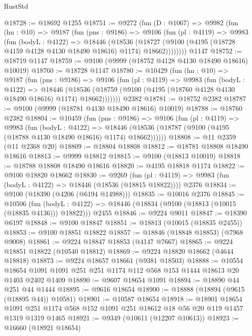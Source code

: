 \begin{lexlean}{RustStd}
\begin{coremodule}
@18728 := @18692 @1255
@18751 := @9272
    (fun (D : @1067) =>
    @9982
      (fun (hn : @10) =>
      @9187
        (fun (pns : @9186) =>
        @9106
          (fun (pl : @4119) =>
          @9983
            (fun (bodyL : @4122) =>
            @18446
              (@18536
                (@18727 (@9100 (@4195 (@18728 @4159 @4128 @4130 @18490 @18616) @1174) @18662))))))))
    @1147
@18752 := @18719 @1147
@18759 := @9100 (@9999 (@18752 @4128 @4130 @18490 @18616) @10019)
@18760 := @18728 @1147
@18780 := @10429
    (fun (hn : @10) =>
    @9187
      (fun (pns : @9186) =>
      @9106
        (fun (pl : @4119) =>
        @9983
          (fun (bodyL : @4122) =>
          @18446
            (@18536 (@18759 (@9100 (@4195 (@18760 @4128 @4130 @18490 @18616) @1174) @18662)))))))
    @2382
@18781 := @18752 @2382
@18787 := @9100 (@9999 (@18781 @4130 @18490 @18616) @10019)
@18788 := @18760 @2382
@18804 := @10459
    (fun (pns : @9186) =>
    @9106
      (fun (pl : @4119) =>
      @9983
        (fun (bodyL : @4122) =>
        @18446 (@18536 (@18787 (@9100 (@4195 (@18788 @4130 @18490 @18616) @1174) @18662))))))
@18808 := @11 @2359 (@11 @2368 @20)
@18809 := @18804 @18808
@18812 := @18781 @18808 @18490 @18616
@18813 := @9999 @18812
@18815 := @9100 (@18813 @10019)
@18818 := @18788 @18808 @18490 @18616
@18820 := @4195 @18818 @1174
@18822 := @9100 @18820 @18662
@18830 := @9269
    (fun (pl : @4119) => @9983 (fun (bodyL : @4122) => @18446 (@18536 (@18815 @18822))))
    @2376
@18834 := @9100 (@18390 (@4206 (@6194 @14988)))
@18835 := @10016 @2376
@18845 := @10506
    (fun (bodyL : @4122) => @18446 (@18834 (@9100 (@18813 (@10015 (@18835 @4136))) @18822)))
    @2455
@18846 := @9224 @9011
@18847 := @18390 @6197
@18848 := @9100 @18847
@18851 := @18813 (@10015 (@18835 @2455))
@18853 := @9100 @18851 @18822
@18857 := @18846 (@18848 @18853) (@7968 @9008)
@18861 := @9224 @18847 @18853 (@4147 @7667)
@18865 := @9224 @18851 @18822 (@10540 @18812)
@18869 := @9224 @18820 @18662 (@4644 @18818)
@18873 := @9224 @18657 @18661 (@9381 @18503)
@18888 := @10554
    @18654
    @1091
    @1091
    @251
    @251
    @1174
    @112
    @568
    @153
    @1444
    @18613
    @20
    @1403
    @2402
    @1409
@18890 := @9607 @18654 @1091
@18894 := @18890 @44 @251 @44 @1444
@18895 := @9616 @18654
@18900 := @18888 (@18894 (@9615 (@18895 @44)) @10581)
@18901 := @10587 @18654
@18918 := @18901
    @18654
    @1091
    @251
    @1174
    @568
    @152
    @1091
    @251
    @18612
    @18
    @56
    @20
    @119
    @1457
    @1319
    @1319
    @1465
@18921 := @9349 (@10611 (@12207 @10613))
@18923 := @16660 (@18921 @18654)

\end{coremodule}
\end{lexlean}

